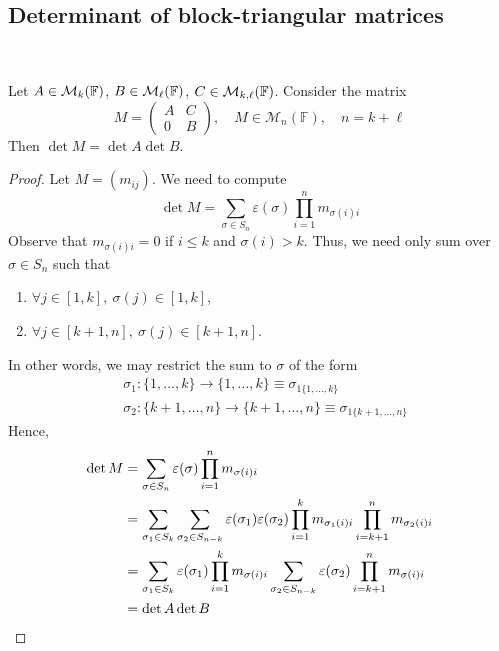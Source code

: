 \documentclass[a4paper]{article}
\begin{document}
\subsection{Determinant of block-triangular matrices}\ \vspace{-1.5em}
\begin{lemma}
	Let $ A \in {\mathcal{M}}_k({\mathbb{F}}) $, $ B \in {\mathcal{M}}_\ell({\mathbb{F}}) $, $ C \in {\mathcal{M}}_{k, \ell}({\mathbb{F}}) $.
	Consider the matrix
	\[
		M = \begin{pmatrix}
			A & C \\
			0 & B
		\end{pmatrix},\quad M\in \mathcal{M}_{n}(\mathbb{F}),\quad n = k+\ell
	\]
	Then $ \det M = \det A \det B $.
\end{lemma}
\begin{proof}
	Let $ M = (m_{ij}) $.
	We need to compute
	\[
		\det M = \sum_{\sigma \in S_n} \varepsilon(\sigma) \prod_{i=1}^n m_{\sigma(i) i}
	\]
	Observe that $ m_{\sigma(i) i} = 0 $ if $ i \leq k $ and $ \sigma(i) > k $.
	Thus, we need only sum over $ \sigma\in S_n $ such that 
	\begin{enumerate}
		\item $ \forall j\in [1,k],\ \sigma(j)\in [1,k] $,
		\item $ \forall j\in [k+1, n], \ \sigma(j)\in [k+1,n] $. 
	\end{enumerate}
	In other words, we may restrict the sum to $ \sigma $ of the form 
	\begin{align*}
		& \sigma_1 : \{1,\dots,k\} \to \{1,\dots,k\} \equiv \sigma_{1 \{1,\dots,k\}}\\ 
		& \sigma_2 : \{k+1,\dots,n\} \to \{k+1,\dots,n\} \equiv \sigma_{1 \{k+1,\dots,n\}}
	\end{align*}
	Hence,
	\begin{align*}
		\det M & = \sum_{\sigma \in S_n} \varepsilon(\sigma) \prod_{i=1}^n m_{\sigma(i) i}                                                         \\
		       & = \sum_{\sigma_1 \in S_k} \sum_{\sigma_2 \in S_{n-k}} \varepsilon(\sigma_1) \varepsilon(\sigma_2) \prod_{i=1}^k m_{\sigma_1(i) i} \prod_{i=k+1}^n m_{\sigma_2(i) i} \\
		       & = \sum_{\sigma_1 \in S_k} \varepsilon(\sigma_1) \prod_{i=1}^k m_{\sigma(i) i} \sum_{\sigma_2 \in S_{n-k}} \varepsilon(\sigma_2) \prod_{i=k+1}^n m_{\sigma(i) i} \\
		       & = \det A \det B\qedhere
	\end{align*}
\end{proof}
\end{document}
